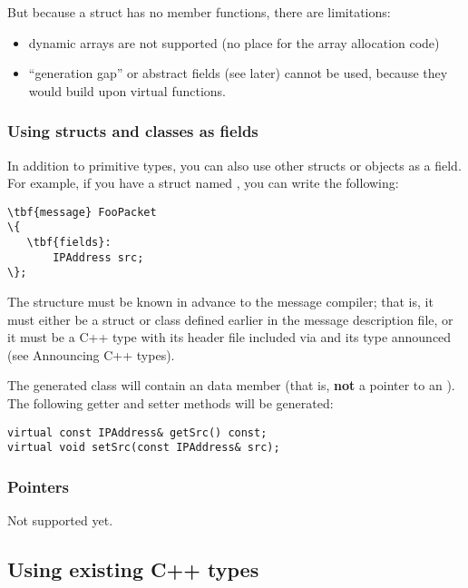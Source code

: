 But because a struct has no member functions, there are limitations:

\begin{itemize}
   \item dynamic arrays are not supported (no place for the array allocation code)
   \item ``generation gap'' or abstract fields (see later) cannot be used,
      because they would build upon virtual functions.
\end{itemize}


\subsubsection{Using structs and classes as fields}

In addition to primitive types, you can also use other structs or objects
as a field. For example, if you have a struct named ,
you can write the following:

\begin{Verbatim}[commandchars=\\\{\}]
\tbf{message} FooPacket
\{
   \tbf{fields}:
       IPAddress src;
\};
\end{Verbatim}

The  structure must be known in advance to the message compiler;
that is, it must either be a struct or class defined earlier in the message
description file, or it must be a C++ type with its header file
included via  and its type announced
(see Announcing C++ types).

The generated class will contain an  data member
(that is, \textbf{not} a pointer to an ).
The following getter and setter methods will be generated:

\begin{verbatim}
virtual const IPAddress& getSrc() const;
virtual void setSrc(const IPAddress& src);
\end{verbatim}


\subsubsection{Pointers}

Not supported yet.



\subsection{Using existing C++ types}


